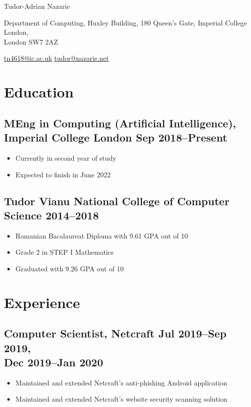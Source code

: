 \documentclass[a4paper]{article}
\begin{document}
\begin{center}
	{\huge\sffamily Tudor-Adrian Nazarie}

	\vspace{4pt}

	Department of Computing, Huxley Building, 180 Queen's Gate, Imperial
	College London,\\ London SW7 2AZ

	\vspace{4pt}

	\href{mailto:tn4618@ic.ac.uk}{tn4618@ic.ac.uk}
        \href{mailto:tudor@nazarie.net}{tudor@nazarie.net}


	\vspace{-12pt}
\end{center}

\section*{Education}
\subsection*{MEng in Computing (Artificial Intelligence), Imperial College
London \hfill Sep 2018--Present}
\begin{itemize}
	\item Currently in second year of study
	\item Expected to finish in June 2022
\end{itemize}

\subsection*{Tudor Vianu National College of Computer Science \hfill 2014--2018}
\begin{itemize}
	\item Romanian Bacalaureat Diploma with 9.61 GPA out of 10
	\item Grade 2 in STEP I Mathematics
	\item Graduated with 9.26 GPA out of 10
\end{itemize}

\section*{Experience}
\subsection*{Computer Scientist, Netcraft \hfill Jul 2019--Sep 2019,\\ \hfill
  Dec 2019--Jan 2020}
\begin{itemize}
  \item Maintained and extended Netcraft's anti-phishing Android application
  \item Maintained and extended Netcraft's website security scanning solution
\end{itemize}
\end{document}
